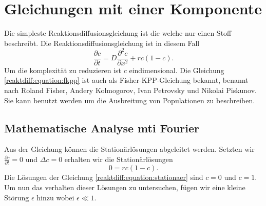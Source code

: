 %
%
%
%
\section{Gleichungen mit einer Komponente
\label{reaktdiff:section:teil3}}
Die simpleste Reaktionsdiffusionsgleichung ist die welche nur einen Stoff beschreibt.
Die Reaktionsdiffusionsgleichung ist in diesem Fall
\begin{equation}
\label{reaktdiff:equation:fkpp}
\frac{\partial c}{\partial t} = D \frac{\partial^2 c}{\partial x^2} + rc(1-c).
\end{equation}
Um die komplexität zu reduzieren ist \(c\) eindimensional. 
Die Gleichung \ref{reaktdiff:equation:fkpp} ist auch als Fisher-KPP-Gleichung\cite{wikipedia_kpp_fisher} bekannt, benannt nach Roland Fisher, Andery Kolmogorov, Ivan Petrovsky und Nikolai Piskunov.
Sie kann benutzt werden um die Ausbreitung von Populationen zu beschreiben.

\subsection{Mathematische Analyse mti Fourier
\label{reaktdiff:subsection:fkppmathe}}
Aus der Gleichung können die Stationärlösungen abgeleitet werden.
Setzten wir \(\frac{\partial c}{\partial t} = 0\) und \(\Delta c = 0\) erhalten wir die Stationärlösungen
\begin{equation}
\label{reaktdiff:equation:stationaer}
0 = rc(1-c).
\end{equation}
Die Lösungen der Gleichung \ref{reaktdiff:equation:stationaer} sind \(c = 0\) und \(c = 1\).
Um nun das verhalten dieser Lösungen zu untersuchen, fügen wir eine kleine Störung \(\epsilon\) hinzu wobei \(\epsilon \ll 1\).

